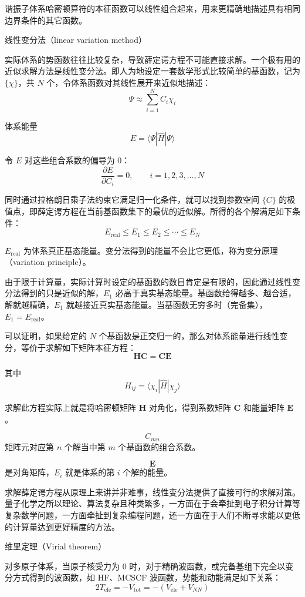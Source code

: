 谐振子体系哈密顿算符的本征函数可以线性组合起来，用来更精确地描述具有相同边界条件的其它函数。

线性变分法（linear variation method）

实际体系的势函数往往比较复杂，导致薛定谔方程不可能直接求解。一个极有用的近似求解方法是线性变分法。即人为地设定一套数学形式比较简单的基函数，记为 $\{\chi\}$，共 $N$ 个，令体系函数对其线性展开来近似地描述：
\[
\Psi \approx \sum_{i=1}^N C_i\chi_i
\]

体系能量
\[
E=\langle \Psi|\hat H|\Psi\rangle
\]

令 $E$ 对这些组合系数的偏导为 $0$：
\[
\frac{\partial E}{\partial C_i}=0,\qquad i=1,2,3,\ldots,N
\]

同时通过拉格朗日乘子法约束它满足归一化条件，就可以找到参数空间 $\{C\}$ 的极值点，即薛定谔方程在当前基函数集下的最优的近似解。所得的各个解满足如下条件：
\[
E_{\mathrm{real}}\le E_1\le E_2\le \cdots \le E_N
\]

$E_{\mathrm{real}}$ 为体系真正基态能量。变分法得到的能量不会比它更低，称为变分原理（variation principle）。

由于限于计算量，实际计算时设定的基函数的数目肯定是有限的，因此通过线性变分法得到的只是近似的解，$E_1$ 必高于真实基态能量。基函数给得越多、越合适，解就越精确，$E_1$ 就越接近真实基态能量。当基函数无穷多时（完备集），$E_1=E_{\mathrm{real}}$。

可以证明，如果给定的 $N$ 个基函数是正交归一的，那么对体系能量进行线性变分，等价于求解如下矩阵本征方程：
\[
\mathbf H\mathbf C=\mathbf C\mathbf E
\]

其中
\[
H_{ij}=\langle \chi_i|\hat H|\chi_j\rangle
\]

求解此方程实际上就是将哈密顿矩阵 $\mathbf H$ 对角化，得到系数矩阵 $\mathbf C$ 和能量矩阵 $\mathbf E$。

\[
C_{mn}
\]
矩阵元对应第 $n$ 个解当中第 $m$ 个基函数的组合系数。

\[
\mathbf E
\]
是对角矩阵，$E_i$ 就是体系的第 $i$ 个解的能量。

求解薛定谔方程从原理上来讲并非难事，线性变分法提供了直接可行的求解对策。量子化学之所以理论、算法复杂且种类繁多，一方面在于会牵扯到电子积分计算等复杂数学问题，一方面牵扯到复杂编程问题，还一方面在于人们不断寻求能以更低的计算量达到更好精度的方法。

维里定理（Virial theorem）

对多原子体系，当原子核受力为 $0$ 时，对于精确波函数，或完备基组下完全以变分方式得到的波函数，如 HF、MCSCF 波函数，势能和动能满足如下关系：
\[
2T_{\mathrm{ele}}=-V_{\mathrm{tot}}=-(V_{\mathrm{ele}}+V_{NN})
\]

